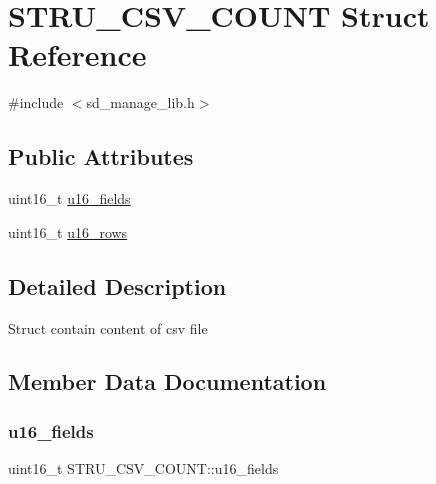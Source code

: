 \hypertarget{struct_s_t_r_u___c_s_v___c_o_u_n_t}{}\section{S\+T\+R\+U\+\_\+\+C\+S\+V\+\_\+\+C\+O\+U\+NT Struct Reference}
\label{struct_s_t_r_u___c_s_v___c_o_u_n_t}


{\ttfamily \#include $<$sd\+\_\+manage\+\_\+lib.\+h$>$}

\subsection*{Public Attributes}
\begin{DoxyCompactItemize}
\item 
uint16\+\_\+t \hyperlink{struct_s_t_r_u___c_s_v___c_o_u_n_t_a4af4f2506d9d9de6cc194b64a077940d}{u16\+\_\+fields}
\item 
uint16\+\_\+t \hyperlink{struct_s_t_r_u___c_s_v___c_o_u_n_t_af557890ea741e79fd5d4a6b7593a379c}{u16\+\_\+rows}
\end{DoxyCompactItemize}


\subsection{Detailed Description}
Struct contain content of csv file 

\subsection{Member Data Documentation}
\mbox{\label{struct_s_t_r_u___c_s_v___c_o_u_n_t_a4af4f2506d9d9de6cc194b64a077940d}} 
\subsubsection{\texorpdfstring{u16\+\_\+fields}{u16\_fields}}
{\footnotesize\ttfamily uint16\+\_\+t S\+T\+R\+U\+\_\+\+C\+S\+V\+\_\+\+C\+O\+U\+N\+T\+::u16\+\_\+fields}

\mbox{\label{struct_s_t_r_u___c_s_v___c_o_u_n_t_af557890ea741e79fd5d4a6b7593a379c}} 
